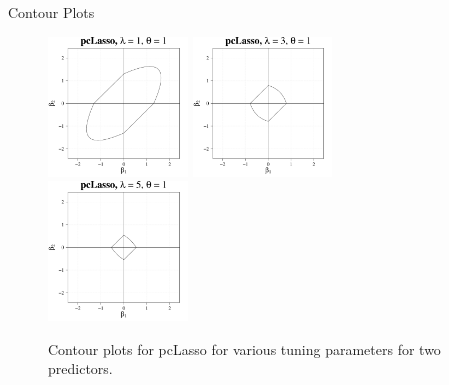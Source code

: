 \documentclass[8pt]{beamer}
\begin{document}
\begin{frame}{Contour Plots}
\begin{figure}
    \includegraphics[width = 0.33\textwidth]{Presentation/cont_pcLasso_l3.pdf}
    \includegraphics[width = 0.33\textwidth]{Presentation/cont_pcLasso_l2.pdf}
    \includegraphics[width = 0.33\textwidth]{Presentation/cont_pcLasso_l1.pdf}
    \caption{Contour plots for pcLasso for various tuning parameters for two predictors.}
    \label{pcLasso_cont}
\end{figure} %
    
\end{frame}
\end{document}

